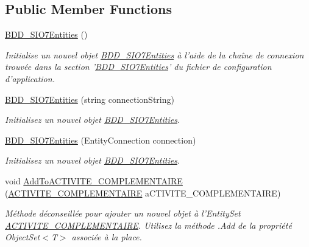 \subsection*{Public Member Functions}
\begin{DoxyCompactItemize}
\item 
\hyperlink{class_model_1_1_b_d_d___s_i_o7_entities_a5dfa0a4c735cbeff99ed45c3f1f91a38}{B\-D\-D\-\_\-\-S\-I\-O7\-Entities} ()
\begin{DoxyCompactList}\small\item\em Initialise un nouvel objet \hyperlink{class_model_1_1_b_d_d___s_i_o7_entities}{B\-D\-D\-\_\-\-S\-I\-O7\-Entities} à l'aide de la chaîne de connexion trouvée dans la section '\hyperlink{class_model_1_1_b_d_d___s_i_o7_entities}{B\-D\-D\-\_\-\-S\-I\-O7\-Entities}' du fichier de configuration d'application. \end{DoxyCompactList}\item 
\hyperlink{class_model_1_1_b_d_d___s_i_o7_entities_aad5811b3abcd4987e89cb0e11e045382}{B\-D\-D\-\_\-\-S\-I\-O7\-Entities} (string connection\-String)
\begin{DoxyCompactList}\small\item\em Initialisez un nouvel objet \hyperlink{class_model_1_1_b_d_d___s_i_o7_entities}{B\-D\-D\-\_\-\-S\-I\-O7\-Entities}. \end{DoxyCompactList}\item 
\hyperlink{class_model_1_1_b_d_d___s_i_o7_entities_a6b57e3f7563e54b376cc5ed738db5db0}{B\-D\-D\-\_\-\-S\-I\-O7\-Entities} (Entity\-Connection connection)
\begin{DoxyCompactList}\small\item\em Initialisez un nouvel objet \hyperlink{class_model_1_1_b_d_d___s_i_o7_entities}{B\-D\-D\-\_\-\-S\-I\-O7\-Entities}. \end{DoxyCompactList}\item 
void \hyperlink{class_model_1_1_b_d_d___s_i_o7_entities_adf0f6d262f390e7bb0ccb29f060b77d4}{Add\-To\-A\-C\-T\-I\-V\-I\-T\-E\-\_\-\-C\-O\-M\-P\-L\-E\-M\-E\-N\-T\-A\-I\-R\-E} (\hyperlink{class_model_1_1_a_c_t_i_v_i_t_e___c_o_m_p_l_e_m_e_n_t_a_i_r_e}{A\-C\-T\-I\-V\-I\-T\-E\-\_\-\-C\-O\-M\-P\-L\-E\-M\-E\-N\-T\-A\-I\-R\-E} a\-C\-T\-I\-V\-I\-T\-E\-\_\-\-C\-O\-M\-P\-L\-E\-M\-E\-N\-T\-A\-I\-R\-E)
\begin{DoxyCompactList}\small\item\em Méthode déconseillée pour ajouter un nouvel objet à l'Entity\-Set \hyperlink{class_model_1_1_a_c_t_i_v_i_t_e___c_o_m_p_l_e_m_e_n_t_a_i_r_e}{A\-C\-T\-I\-V\-I\-T\-E\-\_\-\-C\-O\-M\-P\-L\-E\-M\-E\-N\-T\-A\-I\-R\-E}. Utilisez la méthode .Add de la propriété Object\-Set$<$T$>$ associée à la place. \end{DoxyCompactList}\item 

\end{DoxyCompactItemize}
